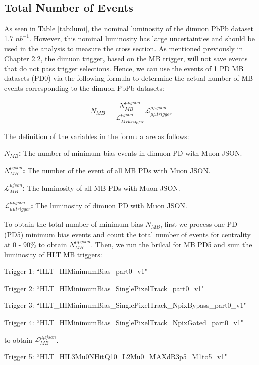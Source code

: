 \subsection{Total Number of Events}

As seen in Table \ref{tab:lumi}, the nominal luminosity of the dimuon PbPb dataset 1.7 $nb^{-1}$. However, this nominal luminosity has large uncertainties and should be used in the analysis to measure the cross section. As mentioned previously in Chapter 2.2, the dimuon trigger, based on the MB trigger, will not save events that do not pass trigger selections. Hence, we can use the events of 1 PD MB datasets (PD0) via the following formula to determine the actual number of MB events corresponding to the dimuon PbPb datasets: 


\begin{equation}
N_{MB} = \frac{N^{\mu\mu json}_{MB}}{\mathcal{L}_{MB trigger}^{\mu json}} \mathcal{L}_{\mu\mu trigger}^{\mu\mu json}
\end{equation}

The definition of the variables in the formula are as follows:


\textbf{$N_{MB}$:} The number of minimum bias events in dimuon PD with Muon JSON.

\textbf{$N^{\mu json}_{MB}$:} The number of the event of all MB PDs with Muon JSON. 

\textbf{$\mathcal{L}^{\mu json}_{MB}$:} The luminosity of all MB PDs with Muon JSON.

\textbf{$\mathcal{L}_{\mu\mu trigger}^{\mu\mu json}$:} The luminosity of dimuon PD with Muon JSON.

\iffalse 

To obtain the total number of minimum bias $N_{MB}$, first we process one PD (PD5) minimum bias events and count the total number of events for centrality at 0 - 90\% to obtain $N^{\mu\mu json}_{MB}$. Then, we run the brilcal for MB PD5 and sum the luminosity of HLT MB triggers: 

Trigger 1: ``HLT\_HIMinimumBias\_part0\_v1" 
 
Trigger 2: ``HLT\_HIMinimumBias\_SinglePixelTrack\_part0\_v1"
 
Trigger 3: ``HLT\_HIMinimumBias\_SinglePixelTrack\_NpixBypass\_part0\_v1" 
  
Trigger 4: ``HLT\_HIMinimumBias\_SinglePixelTrack\_NpixGated\_part0\_v1" 
 
to obtain $\mathcal{L}^{\mu\mu json}_{MB}$. 

Trigger 5: ``HLT\_HIL3Mu0NHitQ10\_L2Mu0\_MAXdR3p5\_M1to5\_v1" 

